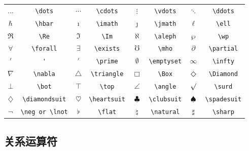 \begin{table}[H]
\centering
\begin{tabular}{*{8}{c}}
$ \dots$ & \verb|\dots| &$\cdots $ & \verb|\cdots| &$\vdots $ & \verb|\vdots| &$ \ddots$ & \verb|\ddots| \\
$\hbar$ & \verb|\hbar| &$\imath $ & \verb|\imath| &$\jmath $ & \verb|\jmath| &$\ell $ & \verb|\ell| \\
$\Re$ & \verb|\Re| &$\Im$ & \verb|\Im| &$\aleph$ & \verb|\aleph| &$\wp$ & \verb|\wp| \\
$\forall$ & \verb|\forall| &$\exists$ & \verb|\exists| &$\mho$ & \verb|\mho|\hyperlink{latexsym}{\footnotemark[1]} &$\partial$ & \verb|\partial| \\
$'$ & \verb|'| &$\prime$ & \verb|\prime| &$\emptyset$ & \verb|\emptyset| &$\infty$ & \verb|\infty| \\
$\nabla$ & \verb|\nabla| &$\triangle$ & \verb|\triangle| &$\Box$ & \verb|\Box|\hyperlink{latexsym}{\footnotemark[1]} &$\Diamond$ & \verb|\Diamond|\hyperlink{latexsym}{\footnotemark[1]} \\
$\bot$ & \verb|\bot| &$\top$ & \verb|\top| &$\angle$ & \verb|\angle| &$\surd$ & \verb|\surd| \\
$\diamondsuit$ & \verb|\diamondsuit| &$\heartsuit$ & \verb|\heartsuit| &$\clubsuit$ & \verb|\clubsuit| &$\spadesuit$ & \verb|\spadesuit| \\
$\neg$ & \verb|\neg or \lnot| &$\flat$ & \verb|\flat| &$\natural$ & \verb|\natural| &$\sharp$ & \verb|\sharp| \\
\end{tabular}
\end{table}

\subsection{关系运算符}

